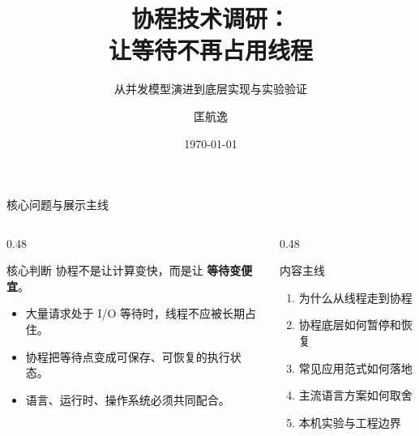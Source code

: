 \documentclass[UTF8,aspectratio=169,11pt]{ctexbeamer}
\title[协程技术调研]{协程技术调研：\\让等待不再占用线程}
\subtitle{从并发模型演进到底层实现与实验验证}
\author[匡航逸 / 2412235]{\texorpdfstring{匡航逸 \quad 2412235}{匡航逸 2412235}}
\institute{并行程序设计调研展示}
\date{\today}
\newcommand{\key}[1]{\textcolor{nkuBlue}{\textbf{#1}}}
\begin{document}
\begin{frame}
  \titlepage
\end{frame}

\begin{frame}{核心问题与展示主线}
  \begin{columns}[T,onlytextwidth]
    \begin{column}{0.48\textwidth}
      \begin{block}{核心判断}
        协程不是让计算变快，而是让 \key{等待变便宜}。
      \end{block}
      \vspace{0.6em}
      \begin{itemize}
        \item 大量请求处于 I/O 等待时，线程不应被长期占住。
        \item 协程把等待点变成可保存、可恢复的执行状态。
        \item 语言、运行时、操作系统必须共同配合。
      \end{itemize}
    \end{column}
    \begin{column}{0.48\textwidth}
      \begin{block}{内容主线}
        \begin{enumerate}
          \item 为什么从线程走到协程
          \item 协程底层如何暂停和恢复
          \item 常见应用范式如何落地
          \item 主流语言方案如何取舍
          \item 本机实验与工程边界
        \end{enumerate}
      \end{block}
    \end{column}
  \end{columns}
\end{frame}
\end{document}
